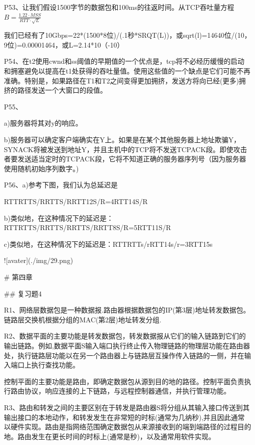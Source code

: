 \documentclass[11pt,UTF8,twoside]{article}
\begin{document}
	P53、让我们假设1500字节的数据包和100ms的往返时间。从TCP吞吐量方程$B=\frac{1.22 \cdot MSS}{RTT \cdot \sqrt{L}}$
	
	我们已经有了10Gbps=22*(1500*8位)/(.1秒*SRQT(L))，或sqrt(l)=14640位/(10，9位)=0.00001464，或L=2.14*10（-10）
	
	P54、在t2使用cwnd和ss阈值的早期值的一个优点是，tcp将不必经历缓慢的启动和拥塞避免以提高在t1处获得的吞吐量值。使用这些值的一个缺点是它们可能不再准确。特别是，如果路径在T1和T2之间变得更加拥挤，发送方将向已经(更多)拥挤的路径发送一个大窗口的段值。
	
	P55、
	
	a)服务器将其对y的响应。
	
	b)服务器可以确定客户端确实在Y上。如果是在某个其他服务器上地址欺骗Y，SYNACK将被发送到地址Y，并且主机中的TCP将不发送TCPACK段。即使攻击者要发送适当定时的TCPACK段，它将不知道正确的服务器序列号（因为服务器使用随机初始序列数字。)
	
	P56、a)参考下图，我们认为总延迟是
	
	RTTRTTS/RRTTS/RRTT12S/R=4RTT14S/R
	
	b)类似地，在这种情况下的延迟是：RTTRTTS/RRTTS/RRTTS/RRTT8S/R=5RTT11S/R
	
	c)类似地，在这种情况下的延迟是：RTTRTTs/rRTT14s/r=3RTT15s
	
	![avater](./img/29.png)
	
		\newpage
	\pagestyle{fancy}
	\fancyhf{}  %
	\pagestyle{fancy}
	
	# 第四章
	
	## 复习题4 
	
	R1、网络层数据包是一种数据报.路由器根据数据包的IP(第3层)地址转发数据包。链路层交换机根据分组的MAC(第2层)地址转发分组.
	
	R2、数据平面的主要功能是转发数据包，转发数据报从它们的输入链路到它们的输出链路。例如,数据平面S输入端口执行终止传入物理链路的物理层功能在路由器处，执行链路层功能以在另一个路由器上与链路层互操作传入链路的一侧，并在输入端口上执行查找功能。
	
	控制平面的主要功能是路由，即确定数据包从源到目的地的路径。控制平面负责执行路由协议，响应连接的上下链路，与远程控制器通信，并执行管理功能。
	
	R3、路由和转发之间的主要区别在于转发是路由器S将分组从其输入接口传送到其输出接口的本地动作，和转发发生在非常短的时标(通常为几纳秒),并且因此通常以硬件实现。路由是指网络范围确定数据包从来源接收到的端到端路径的过程目的地。路由发生在更长时间的时标上(通常是秒)，以及通常用软件实现。
	
\end{document}
